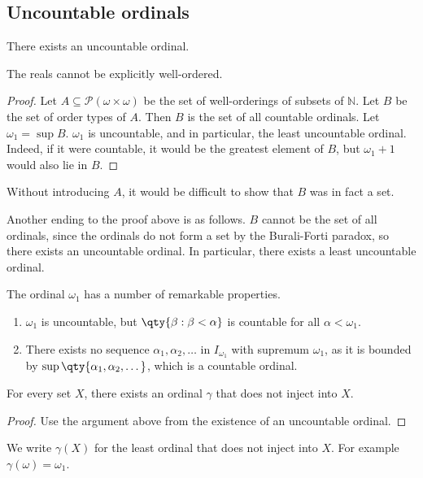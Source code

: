 \subsection{Uncountable ordinals}
\begin{theorem}
    There exists an uncountable ordinal.
\end{theorem}
\begin{remark}
    The reals cannot be explicitly well-ordered.
\end{remark}
\begin{proof}
    Let $A \subseteq \mathcal P (\omega \times \omega)$ be the set of well-orderings of subsets of $\mathbb N$.
    Let $B$ be the set of order types of $A$.
    Then $B$ is the set of all countable ordinals.
    Let $\omega_1 = \sup B$.
    $\omega_1$ is uncountable, and in particular, the least uncountable ordinal.
    Indeed, if it were countable, it would be the greatest element of $B$, but $\omega_1 + 1$ would also lie in $B$.
\end{proof}
\begin{remark}
    Without introducing $A$, it would be difficult to show that $B$ was in fact a set.
\end{remark}
\begin{remark}
    Another ending to the proof above is as follows.
    $B$ cannot be the set of all ordinals, since the ordinals do not form a set by the Burali-Forti paradox, so there exists an uncountable ordinal.
    In particular, there exists a least uncountable ordinal.
\end{remark}
The ordinal $\omega_1$ has a number of remarkable properties.
\begin{enumerate}
    \item $\omega_1$ is uncountable, but $\qty{\beta : \beta < \alpha}$ is countable for all $\alpha < \omega_1$.
    \item There exists no sequence $\alpha_1, \alpha_2, \dots$ in $I_{\omega_1}$ with supremum $\omega_1$, as it is bounded by $\sup\qty{\alpha_1, \alpha_2, \dots}$, which is a countable ordinal.
\end{enumerate}
\begin{theorem}
    For every set $X$, there exists an ordinal $\gamma$ that does not inject into $X$.
\end{theorem}
\begin{proof}
    Use the argument above from the existence of an uncountable ordinal.
\end{proof}
We write $\gamma(X)$ for the least ordinal that does not inject into $X$.
For example $\gamma(\omega) = \omega_1$.

